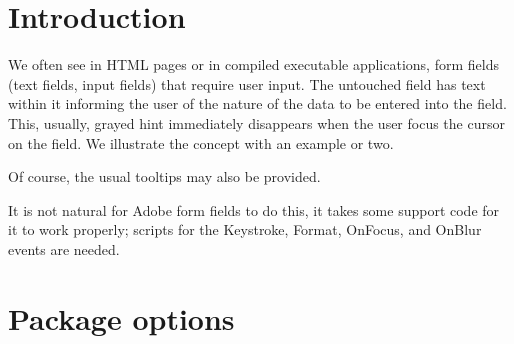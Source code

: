 \documentclass{article}
\begin{document}
\maketitle

\tableofcontents
{}


\section{Introduction}

We often see in HTML pages or in compiled executable applications, form
fields (text fields, input fields) that require user input. The untouched
field has text within it informing the user of the nature of the data to be
entered into the field. This, usually, grayed hint immediately disappears
when the user focus the cursor on the field. We illustrate the concept with
an example or two.
\begin{quote}
    \vcgBdry[\medskipamount]
    \cgBdry[1.5em]
\end{quote}
    Of course, the usual tooltips may also be provided.\medskip\noindent

    It is not natural for Adobe form fields to do this, it takes some support
    code for it to work properly; scripts for the Keystroke, Format, OnFocus,
    and OnBlur events are needed.

\section{Package options}
\end{document}
